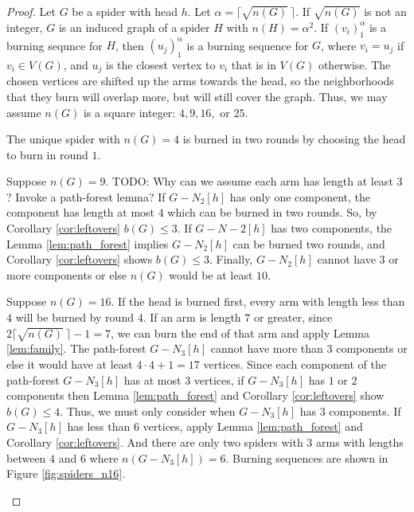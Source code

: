 \documentclass[12pt]{article}
\begin{document}
\begin{proof}
    Let $G$ be a spider with head $h$.
    Let $\alpha = \lceil \sqrt{n(G)}\ \rceil$.
    If $\sqrt{n(G)}$ is not an integer, $G$ is an induced graph of a spider $H$ with $n(H) = \alpha^2$.
    If $(v_i)_1^\alpha$ is a burning sequnce for $H$, then $(u_j)_1^\alpha$ is a burning sequence for $G$, where $v_i = u_j$ if $v_i \in V(G)$, and $u_j$ is the closest vertex to $v_i$ that is in $V(G)$ otherwise.
    The chosen vertices are shifted up the arms towards the head, so the neighborhoods that they burn will overlap more, but will still cover the graph.
    Thus, we may assume $n(G)$ is a square integer: $4, 9, 16,$ or $25$.
    
    The unique spider with $n(G) = 4$ is burned in two rounds by choosing the head to burn in round $1$.
    
    Suppose $n(G) = 9$.
    TODO: Why can we assume each arm has length at least $3$? Invoke a path-forest lemma?
    If $G - N_2[h]$ has only one component, the component has length at most $4$ which can be burned in two rounds.
    So, by Corollary \ref{cor:leftovers} $b(G) \leq 3$.
    If $G - N-2[h]$ has two components, the Lemma \ref{lem:path_forest} implies $G-N_2[h]$ can be burned two rounds, and Corollary \ref{cor:leftovers} shows $b(G) \leq 3$.
    Finally, $G -N_2[h]$ cannot have $3$ or more components or else $n(G)$ would be at least $10$.

    Suppose $n(G) = 16$.
    If the head is burned first, every arm with length less than $4$ will be burned by round $4$.
    If an arm is length $7$ or greater, since $2\lceil \sqrt{n(G)}\ \rceil - 1 = 7$, we can burn the end of that arm and apply Lemma \ref{lem:family}.
    The path-forest $G - N_3[h]$ cannot have more than $3$ components or else it would have at least $4 \cdot 4 + 1 = 17$ vertices.
    Since each component of the path-forest $G - N_3[h]$ has at most $3$ vertices, if $G-N_3[h]$ has $1$ or $2$ components then Lemma \ref{lem:path_forest} and Corollary \ref{cor:leftovers} show $b(G) \leq 4$.
    Thus, we must only consider when $G-N_3[h]$ has $3$ components.
    If $G-N_3[h]$ has less than $6$ vertices, apply Lemma \ref{lem:path_forest} and Corollary \ref{cor:leftovers}.
    And there are only two spiders with $3$ arms with lengths between $4$ and $6$ where $n(G-N_3[h]) = 6$.
    Burning sequences are shown in Figure \ref{fig:spiders_n16}.

    \begin{figure}
        \centering
        \begin{tiny}
\end{tiny}
\end{figure}
\end{proof}
\end{document}
